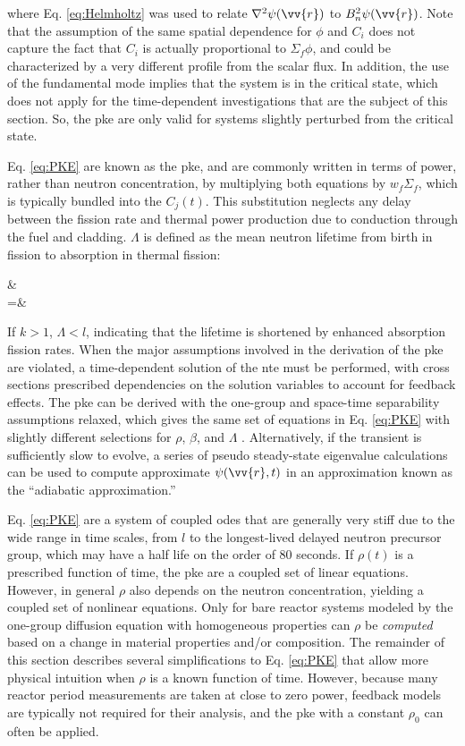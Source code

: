 where Eq. \eqref{eq:Helmholtz} was used to relate \(\nabla^2\psi(\vv{r})\) to \(B_n^2\psi(\vv{r})\). Note that the assumption of the same spatial dependence for \(\phi\) and \(C_i\) does not capture the fact that \(C_i\) is actually proportional to \(\Sigma_f\phi\), and could be characterized by a very different profile from the scalar flux. In addition, the use of the fundamental mode implies that the system is in the critical state, which does not apply for the time-dependent investigations that are the subject of this section. So, the \gls{pke} are only valid for systems slightly perturbed from the critical state.

Eq. \eqref{eq:PKE} are known as the \gls{pke}, and are commonly written in terms of power, rather than neutron concentration, by multiplying both equations by \(w_f\Sigma_f\), which is typically bundled into the \(C_j(t)\). This substitution neglects any delay between the fission rate and thermal power production due to conduction through the fuel and cladding. \(\Lambda\) is defined as the mean neutron lifetime from birth in fission to absorption in thermal fission:

\beqa
\label{eq:LambdaDef}
\Lambda\equiv&\\
=&
\eeqa

If \(k>1\), \(\Lambda<l\), indicating that the lifetime is shortened by enhanced absorption fission rates. When the major assumptions involved in the derivation of the \gls{pke} are violated, a time-dependent solution of the \gls{nte} must be performed, with cross sections prescribed dependencies on the solution variables to account for feedback effects. The \gls{pke} can be derived with the one-group and space-time separability assumptions relaxed, which gives the same set of equations in Eq. \eqref{eq:PKE} with slightly different selections for \(\rho\), \(\beta\), and \(\Lambda\) \cite{duderstadt}. Alternatively, if the transient is sufficiently slow to evolve, a series of pseudo steady-state eigenvalue calculations can be used to compute approximate \(\psi(\vv{r},t)\) in an approximation known as the ``adiabatic approximation.''

Eq. \eqref{eq:PKE} are a system of coupled \glspl{ode} that are generally very stiff due to the wide range in time scales, from \(l\) to the longest-lived delayed neutron precursor group, which may have a half life on the order of 80 seconds. If \(\rho(t)\) is a prescribed function of time, the \gls{pke} are a coupled set of linear equations. However, in general \(\rho\) also depends on the neutron concentration, yielding a coupled set of nonlinear equations. Only for bare reactor systems modeled by the one-group diffusion equation with homogeneous properties can \(\rho\) be {\it computed} based on a change in material properties and/or composition. The remainder of this section describes several simplifications to Eq. \eqref{eq:PKE} that allow more physical intuition when \(\rho\) is a known function of time. However, because many reactor period measurements are taken at close to zero power, feedback models are typically not required for their analysis, and the \gls{pke} with a constant \(\rho_0\) can often be applied.

